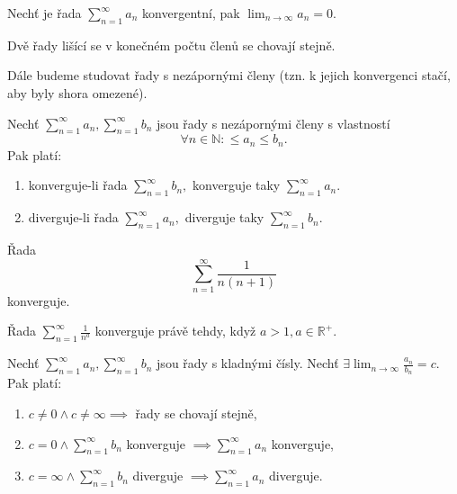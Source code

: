 \begin{veta}
    Nechť je řada $\sum_{n=1}^\infty a_n$ konvergentní, pak $\lim_{n\to\infty} a_n=0.$
\end{veta}

\begin{veta}
    Dvě řady lišící se v konečném počtu členů se chovají stejně.
\end{veta}

\begin{pozn}
    Dále budeme studovat řady s nezápornými členy (tzn. k jejich konvergenci stačí, aby byly shora omezené).
\end{pozn}

\begin{veta}
Nechť $\sum_{n=1}^\infty a_n, \sum_{n=1}^\infty b_n$ jsou řady s nezápornými členy
s vlastností
$$\forall n \in \mathbb N: \leq a_n \leq b_n.$$
Pak platí:
\begin{enumerate}[$i.$]
\item konverguje-li řada $\sum_{n=1}^\infty b_n,$ konverguje taky $\sum_{n=1}^\infty a_n.$
\item diverguje-li řada $\sum_{n=1}^\infty a_n,$ diverguje taky $\sum_{n=1}^\infty b_n.$
\end{enumerate}
\end{veta}

\begin{pozn}
    Řada
    $$\sum_{n=1}^\infty \frac{1}{n(n+1)}$$
    konverguje.
\end{pozn}

\begin{veta}
    Řada $\sum_{n=1}^\infty \frac{1}{n^a}$ konverguje právě tehdy, když $a>1, a\in \mathbb R^+.$
\end{veta}

\begin{veta}
Nechť $\sum_{n=1}^\infty a_n, \sum_{n=1}^\infty b_n$ jsou řady s kladnými čísly.
Nechť $\exists \lim_{n\to\infty}\frac{a_n}{b_n}=c.$ Pak platí:
\begin{enumerate}[$i.$]
\item $c\ne 0\land c\ne \infty \implies$ řady se chovají stejně,
\item $c=0 \land \sum_{n=1}^\infty b_n$ konverguje $\implies \sum_{n=1}^\infty a_n$ konverguje,
\item $c=\infty \land \sum_{n=1}^\infty b_n$ diverguje $\implies \sum_{n=1}^\infty a_n$ diverguje.
\end{enumerate}
\end{veta}

